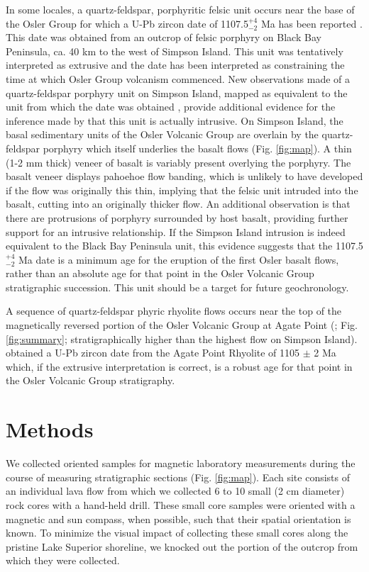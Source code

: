 \documentclass[draft,gc]{AGUTeX}
\begin{document}
\begin{article}
In some locales, a quartz-feldspar, porphyritic felsic unit occurs near the base of the Osler Group for which a U-Pb zircon date of 1107.5$^{+4}_{-2}$ Ma has been reported \citep{Davis1985a}.  This date was obtained from an outcrop of felsic porphyry on Black Bay Peninsula, ca. 40 km to the west of Simpson Island.  This unit was tentatively interpreted as extrusive \citep{Davis1985a, Lightfoot1991a} and the date has been interpreted as constraining the time at which Osler Group volcanism commenced.  New observations made of a quartz-feldspar porphyry unit on Simpson Island, mapped as equivalent to the unit from which the date was obtained \citep{Giguere1975a}, provide additional evidence for the inference made by \citet{Giguere1975a} that this unit is actually intrusive.  On Simpson Island, the basal sedimentary units of the Osler Volcanic Group are overlain by the quartz-feldspar porphyry which itself underlies the basalt flows (Fig. \ref{fig:map}). A thin (1-2 mm thick) veneer of basalt is variably present overlying the porphyry.  The basalt veneer displays pahoehoe flow banding, which is unlikely to have developed if the flow was originally this thin, implying that the felsic unit intruded into the basalt, cutting into an originally thicker flow.  An additional observation is that there are protrusions of porphyry surrounded by host basalt, providing further support for an intrusive relationship. If the Simpson Island intrusion is indeed equivalent to the Black Bay Peninsula unit, this evidence suggests that the  1107.5$^{+4}_{-2}$ Ma  date is a minimum age for the eruption of the first Osler basalt flows, rather than an absolute age for that point in the Osler Volcanic Group stratigraphic succession. This unit should be a target for future geochronology.

A sequence of quartz-feldspar phyric rhyolite flows occurs near the top of the magnetically reversed portion of the Osler Volcanic Group at Agate Point (\cite{Davis1985a}; Fig. \ref{fig:summary}; stratigraphically higher than the highest flow on Simpson Island). \cite{Davis1997a} obtained a U-Pb zircon date from the Agate Point Rhyolite of 1105 $\pm$ 2 Ma which, if the extrusive interpretation is correct, is a robust age for that point in the Osler Volcanic Group stratigraphy.

\section{Methods}

We collected oriented samples for magnetic laboratory measurements during the course of measuring stratigraphic sections (Fig. \ref{fig:map}). Each site consists of an individual lava flow from which we collected 6 to 10 small (2 cm diameter) rock cores with a hand-held drill. These small core samples were oriented with a magnetic and sun compass, when possible, such that their spatial orientation is known. To minimize the visual impact of collecting these small cores along the pristine Lake Superior shoreline, we knocked out the portion of the outcrop from which they were collected.


\end{article}
\end{document}
